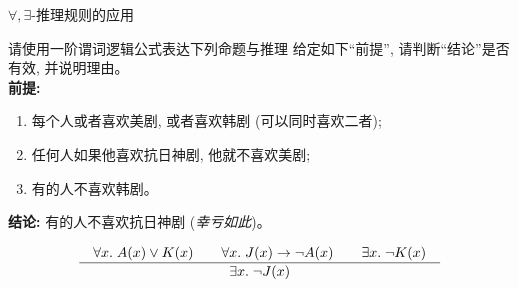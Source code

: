 \begin{frame}{$\forall, \exists$-推理规则的应用}
  \begin{exampleblock}{请使用一阶谓词逻辑公式表达下列命题与推理}
    给定如下``前提'', 请判断``结论''是否有效, 并说明理由。\\[10pt]
    {\bf 前提:}
    \begin{enumerate}[(1)]
      \item 每个人或者喜欢美剧, 或者喜欢韩剧 (可以同时喜欢二者);
      \item 任何人如果他喜欢抗日神剧, 他就不喜欢美剧;
      \item 有的人不喜欢韩剧。
    \end{enumerate}

    \vspace{0.20cm}
    {\bf 结论:} 有的人不喜欢抗日神剧 ({\it 幸亏如此})。
  \end{exampleblock}

  \pause
  \vspace{0.50cm}
  \[
    \frac{\quad\forall x.\; A(x) \lor K(x) \qquad
      \forall x.\; J(x) \to \lnot A(x) \qquad
      \exists x.\; \lnot K(x)\quad}{\quad\exists x.\; \lnot J(x)\quad}
  \]
\end{frame}
